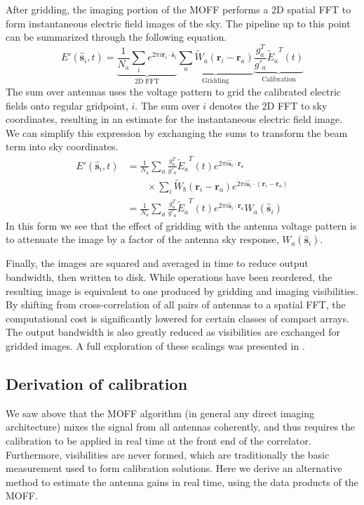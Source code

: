 \documentclass[a4paper,fleqn,usenatbib]{mnras}
\newcommand{\Nant}{\ensuremath{N_{\mathrm{a}}}}
\newcommand{\s}{\ensuremath{\hat{\mathbf{s}}}} %
\newcommand{\ri}{\ensuremath{\mathbf{r}_i}}
\newcommand{\ra}{\ensuremath{\mathbf{r}_a}}
\newcommand{\beamr}{\ensuremath{\widetilde{W}}}
\newcommand{\beamtheta}{\ensuremath{W}}
\newcommand{\Er}[1]{\ensuremath{\widetilde{E}_{#1}}}
\newcommand{\Ethetaest}{\ensuremath{E'}}
\begin{document}
After gridding, the imaging portion of the MOFF performs a 2D spatial FFT to form instantaneous electric field images of the sky. The pipeline up to this point can be summarized through the following equation.
\begin{equation}
\Ethetaest (\s_i,t) = \underbrace{\frac{1}{\Nant} \sum_i e^{2\pi i \ri \cdot \s_i}}_{\mathrm{2D\;FFT}} 
\underbrace{\sum_a \beamr_a(\ri - \ra)}_{\mathrm{Gridding}}
\underbrace{ \frac{g^T_a}{g'_a} \Er{a}^T(t)}_{\mathrm{Calibration}}
\end{equation}
The sum over antennas uses the voltage pattern to grid the calibrated electric fields onto regular gridpoint, $i$. The sum over $i$ denotes the 2D FFT to sky coordinates, resulting in an estimate for the instantaneous electric field image. We can simplify this expression by exchanging the sums to transform the beam term into sky coordinates.
\begin{align}\label{eq:epix}
\Ethetaest(\s_i,t) & = \frac{1}{\Nant} \sum_a \frac{g^T_a}{g'_a}\Er{a}^T(t) e^{2\pi i \s_i \cdot \ra} \nonumber \\
  & \qquad\times \sum_i \beamr_b(\ri-\ra)e^{2\pi i \s_i \cdot (\ri-\ra)} \nonumber\\
& = \frac{1}{\Nant} \sum_a \frac{ g^T_a}{g'_a}\Er{a}^T(t) e^{2\pi i \s_i \cdot \ra}\beamtheta_a(\s_i)
\end{align}
In this form we see that the effect of gridding with the antenna voltage pattern is to attenuate the image by a factor of the antenna sky response, $\beamtheta_a(\s_i)$.

Finally, the images are squared and averaged in time to reduce output bandwidth, then written to disk. While operations have been reordered, the resulting image is equivalent to one produced by gridding and imaging visibilities. By shifting from cross-correlation of all pairs of antennas to a spatial FFT, the computational cost is significantly lowered for certain classes of compact arrays. The output bandwidth is also greatly reduced as visibilities are exchanged for gridded images. A full exploration of these scalings was presented in \citealt{thy15c}.

\subsection{Derivation of calibration}
We saw above that the MOFF algorithm (in general any direct imaging architecture) mixes the signal from all antennas coherently, and thus requires the calibration to be applied in real time at the front end of the correlator. Furthermore, visibilities are never formed, which are traditionally the basic measurement used to form calibration solutions. Here we derive an alternative method to estimate the antenna gains in real time, using the data products of the MOFF. 
\end{document}
